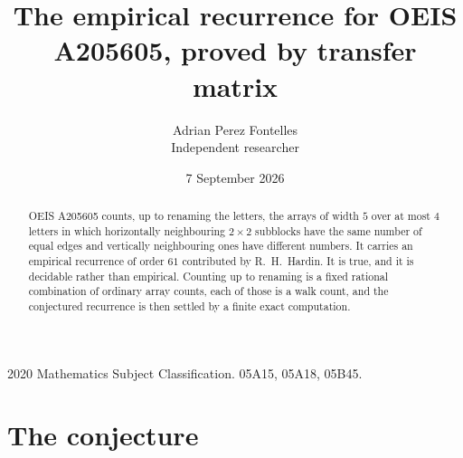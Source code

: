 \documentclass[11pt,a4paper]{article}
\title{The empirical recurrence for OEIS A205605, proved by transfer matrix}
\author{Adrian Perez Fontelles\\ \small Independent researcher}
\date{7 September 2026}
\theoremstyle{plain}
\theoremstyle{definition}
\begin{document}
\maketitle

\begin{abstract}
OEIS A205605 counts, up to renaming the letters, the arrays of width $5$ over at most $4$
letters in which horizontally neighbouring $2\times2$ subblocks have the same number of equal edges and vertically neighbouring ones have different numbers. It carries an empirical recurrence of order $61$ contributed by
R.~H.~Hardin. It is true, and it is decidable rather than empirical. Counting up to renaming is
a fixed rational combination of ordinary array counts, each of those is a walk count, and the
conjectured recurrence is then settled by a finite exact computation.
\end{abstract}

\noindent\small 2020 Mathematics Subject Classification. 05A15, 05A18, 05B45.\normalsize

\section{The conjecture}
\end{document}
